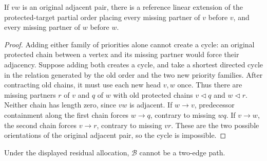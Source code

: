 \begin{lemma}
\label{lem:eta222-two-inward-priorities}
If $vw$ is an original adjacent pair, there is a reference linear
extension of the protected-target partial order placing every
missing partner of $v$ before $v$, and every missing partner of $w$
before $w$.
\end{lemma}

\begin{proof}
Adding either family of priorities alone cannot create a cycle:
an original protected chain between a vertex and its missing partner
would force their adjacency. Suppose adding both creates a cycle,
and take a shortest directed cycle in the relation generated by the
old order and the two new priority families. After contracting old
chains, it must use each new head $v,w$ once. Thus there are missing
partners $r$ of $v$ and $q$ of $w$ with old protected chains
$v\triangleleft q$ and $w\triangleleft r$. Neither chain has
length zero, since $vw$ is adjacent.
If $w\to v$, predecessor containment along the first chain forces
$w\to q$, contrary to missing $wq$. If $v\to w$, the second
chain forces $v\to r$, contrary to missing $vr$.
These are the two possible orientations of the original adjacent
pair, so the cycle is impossible.
\end{proof}

\begin{proposition}
\label{prop:eta222-no-path}
Under the displayed residual allocation, $\mathcal B$ cannot be
a two-edge path.
\end{proposition}

